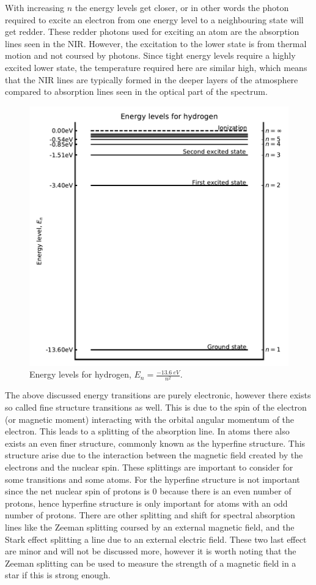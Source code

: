 With increasing $n$ the energy levels get closer, or in other words the photon required to excite an
electron from one energy level to a neighbouring state will get redder. These redder photons used
for exciting an atom are the absorption lines seen in the NIR. However, the excitation to the lower
state is from thermal motion and not coursed by photons. Since tight energy levels require a highly
excited lower state, the temperature required here are similar high, which means that the NIR lines
are typically formed in the deeper layers of the atmosphere compared to absorption lines seen in the
optical part of the spectrum.

\begin{figure}[htpb!]
    \centering
    \includegraphics[width=0.85\linewidth]{figures/energyLevels.pdf}
    \caption{Energy levels for hydrogen, $E_n=\frac{\SI{-13.6}{eV}}{n^2}$.}
    \label{fig:elevel}
\end{figure}

The above discussed energy transitions are purely electronic, however there exists so called fine
structure transitions as well. This is due to the spin of the electron (or magnetic moment)
interacting with the orbital angular momentum of the electron. This leads to a splitting of the
absorption line. In atoms there also exists an even finer structure, commonly known as the hyperfine
structure. This structure arise due to the interaction between the magnetic field created by the
electrons and the nuclear spin. These splittings are important to consider for some transitions and
some atoms. For  the hyperfine structure is not important since the net nuclear spin of
protons is 0 because there is an even number of protons, hence hyperfine structure is only important
for atoms with an odd number of protons. There are other splitting and shift for spectral absorption
lines like the Zeeman splitting coursed by an external magnetic field, and the Stark effect
splitting a line due to an external electric field. These two last effect are minor and will not be
discussed more, however it is worth noting that the Zeeman splitting can be used to measure the
strength of a magnetic field in a star if this is strong enough.



